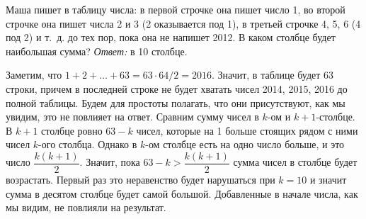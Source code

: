 \problem
Маша пишет в таблицу числа:
в первой строчке она пишет число 1, во второй строчке она пишет числа 2 и 3
(2 оказывается под 1), в третьей строчке 4, 5, 6 (4 под 2) и т.~д. до тех
пор, пока она не напишет 2012.
В каком столбце будет наибольшая сумма?
\solution
\emph{Ответ:} в 10 столбце.
\par
Заметим, что
$1 + 2 + \ldots + 63 = 63 \cdot 64 / 2 = 2016$.
Значит, в таблице будет 63 строки, причем в последней строке не будет хватать
чисел 2014, 2015, 2016 до полной таблицы.
Будем для простоты полагать, что они присутствуют, как мы увидим, это не
повлияет на ответ.
Сравним сумму чисел в $k$-ом и $k + 1$-столбце.
В $k + 1$ столбце ровно $63 - k$ чисел, которые на 1 больше стоящих рядом с
ними чисел $k$-ого столбца.
Однако в $k$-ом столбце есть на одно число больше, и это число
$\dfrac{k (k + 1)}{2}$.
Значит, пока $63 - k > \dfrac{k (k + 1)}{2}$ сумма чисел в столбце будет
возрастать.
Первый раз это неравенство будет нарушаться при $k = 10$ и значит сумма в
десятом столбце будет самой большой.
Добавленные в начале числа, как мы видим, не повлияли на результат.
\endproblem
